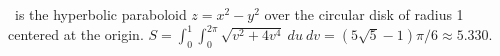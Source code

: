 {\surfaceS\ is the hyperbolic paraboloid $z=x^2-y^2$ over the circular disk of radius 1 centered at the origin.
}
{$S =\int_0^1\int_{0}^{2\pi}\sqrt{v^2+4v^4}\ du\ dv = (5\sqrt{5}-1)\pi/6 \approx 5.330$.
}
